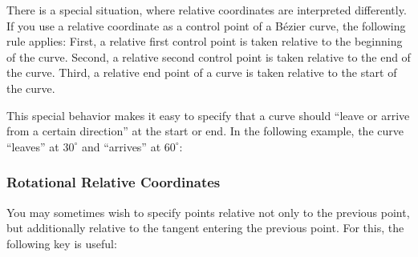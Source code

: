 \begin{codeexample}[]
\end{codeexample}

There is a special situation, where relative coordinates are interpreted
differently. If you use a relative coordinate as a control point of a Bézier
curve, the following rule applies: First, a relative first control point is
taken relative to the beginning of the curve. Second, a relative second control
point is taken relative to the end of the curve. Third, a relative end point of
a curve is taken relative to the start of the curve.

This special behavior makes it easy to specify that a curve should ``leave or
arrive from a certain direction'' at the start or end. In the following
example, the curve ``leaves'' at $30^\circ$ and ``arrives'' at $60^\circ$:
%
\begin{codeexample}[]
\end{codeexample}


\subsubsection{Rotational Relative Coordinates}

You may sometimes wish to specify points relative not only to the previous
point, but additionally relative to the tangent entering the previous point.
For this, the following key is useful:

